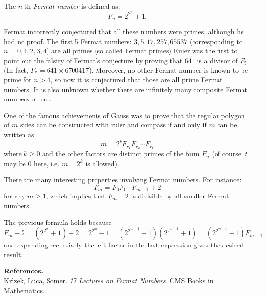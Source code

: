 \documentclass[12pt]{article}
\begin{document}
The $n$-th \emph{Fermat number} is defined as:
\[
  F_n=2^{2^n}+1.
\]

Fermat incorrectly conjectured that all these numbers were primes,
although he had no proof. 
The first 5 Fermat numbers: $3, 5, 17,257,65537$ (corresponding to $n=0,1,2,3,4$) are all primes (so called Fermat primes)
Euler was the first to point out the falsity of Fermat's conjecture 
by proving that $641$ is a divisor of $F_5$. (In fact, $F_5=641\times6700417$).
Moreover, no other Fermat number is known to be prime for $n>4$, so now it is conjectured that those are all prime Fermat numbers. It is also unknown whether there are infinitely many composite Fermat numbers or not.

One of the famous achievements of Gauss was to prove that the regular polygon of $m$ sides can be constructed with ruler and compass if and only if $m$ can be written as
$$m=2^k F_{r_1}F_{r_2}\cdots F_{r_t}$$
where $k\ge 0$ and the other factors are distinct primes of the form $F_n$ (of course, $t$ may be $0$ here, i.e. $m=2^k$ is allowed).

There are many interesting properties involving Fermat numbers. For instance:
\[
F_m = F_0F_1\cdots F_{m-1}+2
\]
for any $m\geq 1$, which implies that $F_m-2$ is divisible by all smaller Fermat numbers.

The previous formula holds because
\[
F_m -2 = (2^{2^m}+1)-2 = 2^{2^m}-1 = (2^{2^{m-1}}-1)(2^{2^{m-1}}+1) =  (2^{2^{m-1}}-1) F_{m-1}
\]
and expanding recursively the left factor in the last expression gives the desired result.

\bigskip
\textbf{References.}\\
Kr\'\i zek, Luca, Somer. \emph{17 Lectures on Fermat Numbers.} CMS Books in Mathematics.
\end{document}
